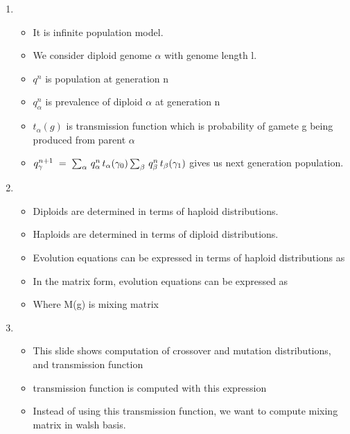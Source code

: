 \documentclass{article}
\begin{document}
\begin{enumerate}
\item
  \begin{itemize}
  \item It is infinite population model.
  \item We consider diploid genome $\alpha$ with genome length l.
  \item $q^n$ is population at generation n
  \item $q^n_\alpha$ is prevalence of diploid $\alpha$ at generation n
  \item $t_{\alpha}(g)$ is transmission function which is probability
    of gamete g being produced from parent $\alpha$
  \item $q_\gamma^{n+1} \; = \; \sum_{\alpha} \, q_\alpha^n \,
    t_\alpha(\gamma_0) \sum_{\beta} \,q_\beta^n \,
    t_\beta(\gamma_1)\\[-.05in]$ gives us next generation population.
  \end{itemize}
    
\item
  \begin{itemize}
  \item Diploids are determined in terms of haploid
    distributions.
  \item Haploids are determined in terms of diploid
    distributions.
  \item Evolution equations can be expressed in terms of haploid
    distributions as
  \item In the matrix form, evolution equations can be expressed as
  \item Where M(g) is mixing matrix
  \end{itemize}
    
\item
  \begin{itemize}
  \item This slide shows computation of crossover and mutation
    distributions, and transmission function  
  \item transmission function is computed with this expression
  \item Instead of using this transmission function, we want to
    compute mixing matrix in walsh basis.
  \end{itemize}
    

\end{enumerate}
\end{document}
